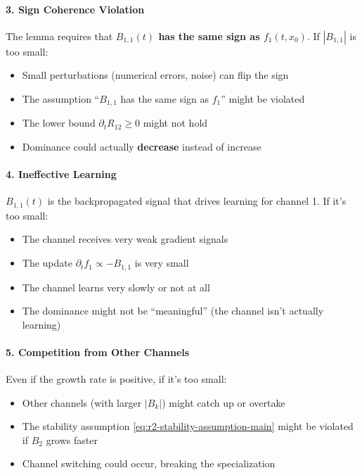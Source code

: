 \paragraph*{3. Sign Coherence Violation}

The lemma requires that \textbf{$B_{1,1}(t)$ has the same sign as $f_1(t,x_0)$}. If $|B_{1,1}|$ is too small:
\begin{itemize}
\item Small perturbations (numerical errors, noise) can flip the sign
\item The assumption ``$B_{1,1}$ has the same sign as $f_1$'' might be violated
\item The lower bound $\partial_t R_{12} \ge 0$ might not hold
\item Dominance could actually \textbf{decrease} instead of increase
\end{itemize}

\paragraph*{4. Ineffective Learning}

$B_{1,1}(t)$ is the backpropagated signal that drives learning for channel 1. If it's too small:
\begin{itemize}
\item The channel receives very weak gradient signals
\item The update $\partial_t f_1 \propto -B_{1,1}$ is very small
\item The channel learns very slowly or not at all
\item The dominance might not be ``meaningful'' (the channel isn't actually learning)
\end{itemize}

\paragraph*{5. Competition from Other Channels}

Even if the growth rate is positive, if it's too small:
\begin{itemize}
\item Other channels (with larger $|B_k|$) might catch up or overtake
\item The stability assumption \eqref{eq:r2-stability-assumption-main} might be violated if $B_2$ grows faster
\item Channel switching could occur, breaking the specialization
\end{itemize}

